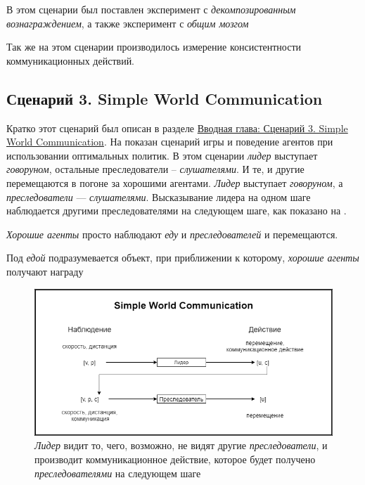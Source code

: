 В этом сценарии был поставлен эксперимент с \textit{декомпозированным вознаграждением}, а также эксперимент с \textit{общим мозгом}

Так же на этом сценарии производилось измерение консистентности коммуникационных действий.

\subsection{Сценарий 3. Simple World Communication} \label{exp-swc}

Кратко этот сценарий был описан в разделе \hyperref[intro-swc]{Вводная глава: Сценарий 3. Simple World Communication}. На  показан сценарий игры и поведение агентов при использовании оптимальных политик. В этом сценарии \textit{лидер} выступает \textit{говоруном}, остальные преследователи – \textit{слушателями}. И те, и другие перемещаются в погоне за хорошими агентами. \textit{Лидер} выступает \textit{говоруном}, а \textit{преследователи} --- \textit{слушателями}. Высказывание лидера на одном шаге наблюдается другими преследователями на следующем шаге, как показано на .

\textit{Хорошие агенты} просто наблюдают \textit{еду} и \textit{преследователей} и перемещаются.

Под \textit{едой} подразумевается объект, при приближении к которому, \textit{хорошие агенты }получают награду

\begin{figure}[ht!]
    \center
    \includegraphics [scale=0.60] {my_folder/images/ch4/simple_world_communication.png}
    \caption{\textit{Лидер} видит то, чего, возможно, не видят другие \textit{преследователи}, и производит коммуникационное действие, которое будет получено \textit{преследователями} на следующем шаге}
    \label{fig:exp-swc}
\end{figure}

